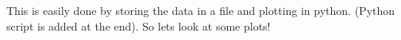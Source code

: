 \documentclass[norsk,a4paper,12pt]{article}
\begin{document}
This is easily done by storing the data in a file and plotting in python. (Python script is added at the end). So lets look at some
plots!
\begin{figure}[H]
  \begin{center}
     \\

\end{center}
\end{figure}
\end{document}
